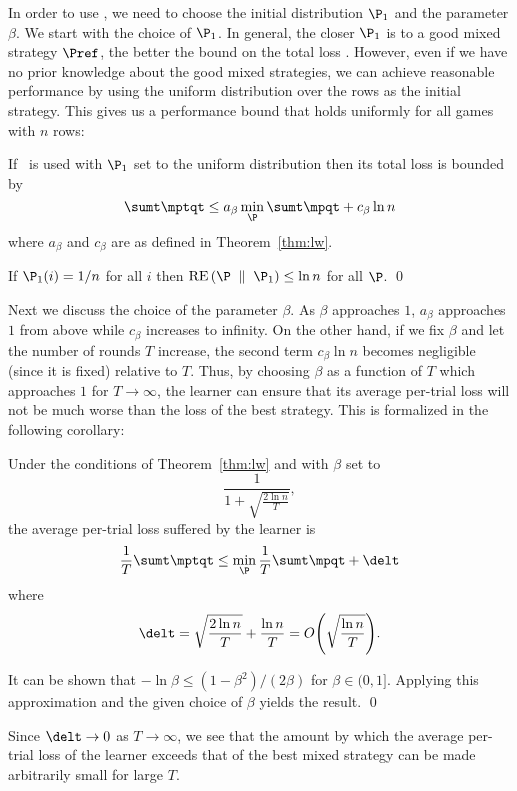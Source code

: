 In order to use \lwalg, we need to choose the initial distribution
$\P_1$ and the parameter $\beta$. We start with the choice of $\P_1$.
In general, the closer $\P_1$ is to a good mixed strategy $\Pref$, the
better the bound on the total loss \lwalg. However, even if we have no
prior knowledge about the good mixed strategies, we can achieve
reasonable performance by using the uniform distribution over the rows
as the initial strategy. This gives us a performance bound that 
holds uniformly for all games with $n$ rows:

\begin{corollary}
If \lwalg\ is used with $\P_1$ set to the uniform distribution then its
total loss is bounded by
\[
   \sumt \mptqt \leq a_\beta \minp \sumt \mpqt + c_\beta \ln n
\]
where $a_\beta$ and $c_\beta$ are as defined in Theorem~\ref{thm:lw}.
\end{corollary}

\proof
If $\P_1(i) = 1/n$ for all $i$ then $\RE{\P}{\P_1}\leq \ln n$ for all
$\P$.
\qed

Next we discuss the choice of the parameter $\beta$.  As $\beta$
approaches $1$, $a_\beta$ approaches $1$ from above while $c_\beta$
increases to
infinity. On the other hand, if we fix $\beta$ and let the number of
rounds $T$ increase, the second term $c_\beta \ln n$ becomes
negligible (since it is fixed) relative to $T$.
Thus, by choosing $\beta$ as a function of $T$ which approaches $1$
for $T \to \infty$, the learner can ensure that its average per-trial loss will
not be much worse than the loss of the best strategy.  This is
formalized in the following corollary:

\begin{corollary}
\label{cor:lw}
Under the conditions of Theorem~\ref{thm:lw} and with $\beta$ set to
\[\frac{1}{1+\sqrt{\frac{2 \ln n}{T}}}, \]
the average per-trial loss suffered by the learner is
\[
   \frac{1}{T} \sumt \mptqt \leq
    \minp \frac{1}{T} \sumt \mpqt + \delt
\]
where
\[
\delt = \sqrt{2 \ln n \over T} + {\ln n \over T} 
= O\paren{\sqrt{\frac{\ln n}{T}}}.
\]
\end{corollary}

\proof
It can be shown that $-\ln \beta \leq (1-\beta^2)/(2\beta)$ for $\beta
\in (0,1]$. Applying this approximation and the given choice of
$\beta$ yields the result.
\qed

Since $\delt \rightarrow 0$ as $T \rightarrow \infty$, we see that the
amount by which the average per-trial loss of the learner exceeds that
of the best mixed strategy can be made arbitrarily small for large
$T$.

